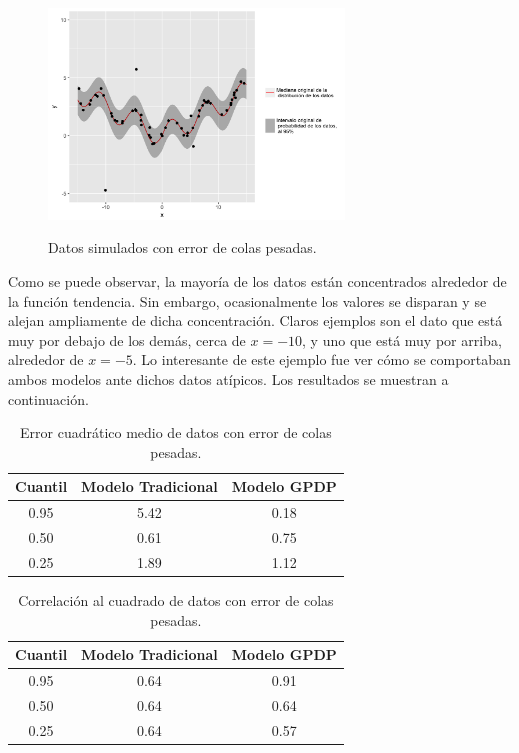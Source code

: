 \begin{figure}[H]
	\centering
	\caption{Datos simulados con error de colas pesadas.}
	\includegraphics[width=0.7\textwidth]{Figures/Simulation/heavy_tails/sample.png}
	\label{sample_heavy_tails}
\end{figure}

Como se puede observar, la mayor\'ia de los datos est\'an concentrados alrededor de la funci\'on tendencia. Sin embargo, ocasionalmente los valores se disparan y se alejan ampliamente de dicha concentraci\'on. Claros ejemplos son el dato que est\'a muy por debajo de los dem\'as, cerca de $x = -10$, y uno que est\'a muy por arriba, alrededor de $x = -5$. Lo interesante de este ejemplo fue ver c\'omo se comportaban ambos modelos ante dichos datos at\'ipicos. Los resultados se muestran a continuaci\'on.

\begin{table}[H]
\centering
\caption{Error cuadrático medio de datos con error de colas pesadas.} 
\begin{tabular}{ccc}
  \hline
Cuantil & Modelo Tradicional & Modelo GPDP \\ 
  \hline
0.95 & 5.42 & 0.18 \\ 
  0.50 & 0.61 & 0.75 \\ 
  0.25 & 1.89 & 1.12 \\ 
   \hline
\end{tabular}
\label{mse_heavy_tails}
\end{table}

\begin{table}[H]
\centering
\caption{Correlación al cuadrado de datos con error de colas pesadas.} 
\begin{tabular}{ccc}
  \hline
Cuantil & Modelo Tradicional & Modelo GPDP \\ 
  \hline
0.95 & 0.64 & 0.91 \\ 
  0.50 & 0.64 & 0.64 \\ 
  0.25 & 0.64 & 0.57 \\ 
   \hline
\end{tabular}
\label{corr_heavy_tails}
\end{table}


